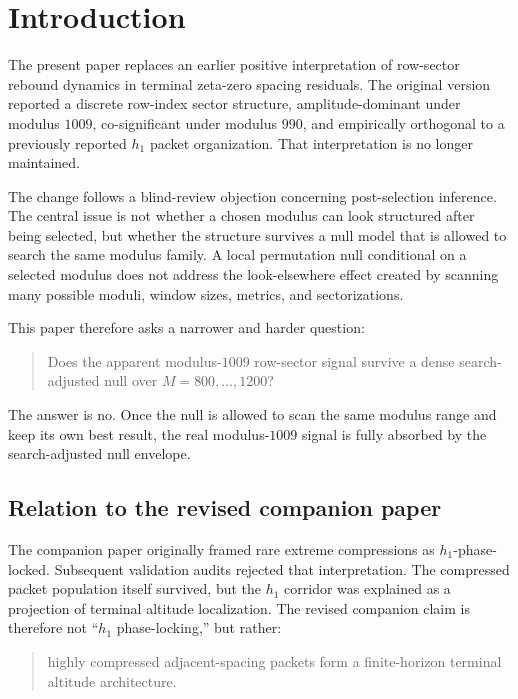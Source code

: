 \documentclass[11pt]{article}
\begin{document}
\section{Introduction}

The present paper replaces an earlier positive interpretation of row-sector rebound dynamics in terminal zeta-zero spacing residuals. The original version reported a discrete row-index sector structure, amplitude-dominant under modulus \(1009\), co-significant under modulus \(990\), and empirically orthogonal to a previously reported \(h_1\) packet organization. That interpretation is no longer maintained.

The change follows a blind-review objection concerning post-selection inference. The central issue is not whether a chosen modulus can look structured after being selected, but whether the structure survives a null model that is allowed to search the same modulus family. A local permutation null conditional on a selected modulus does not address the look-elsewhere effect created by scanning many possible moduli, window sizes, metrics, and sectorizations.

This paper therefore asks a narrower and harder question:
\begin{quote}
Does the apparent modulus-\(1009\) row-sector signal survive a dense search-adjusted null over \(M=800,\ldots,1200\)?
\end{quote}

The answer is no. Once the null is allowed to scan the same modulus range and keep its own best result, the real modulus-\(1009\) signal is fully absorbed by the search-adjusted null envelope.

\subsection{Relation to the revised companion paper}

The companion paper originally framed rare extreme compressions as \(h_1\)-phase-locked. Subsequent validation audits rejected that interpretation. The compressed packet population itself survived, but the \(h_1\) corridor was explained as a projection of terminal altitude localization. The revised companion claim is therefore not ``\(h_1\) phase-locking,'' but rather:
\begin{quote}
highly compressed adjacent-spacing packets form a finite-horizon terminal altitude architecture.
\end{quote}
\end{document}
